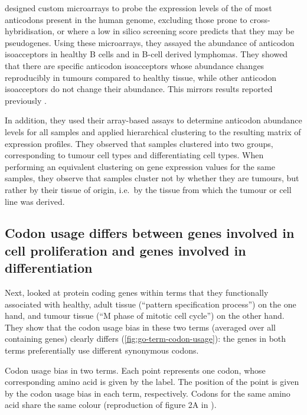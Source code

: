 \citet{Gingold:2014} designed custom microarrays to probe the expression levels
of the \trna[s] of most anticodons present in the human genome, excluding those
prone to cross-hybridi\-sation, or where a low in silico screening score
predicts that they may be pseudogenes. Using these microarrays, they assayed the
abundance of anticodon isoacceptors in healthy B cells and in B-cell derived
lymphomas. They showed that there are specific anticodon isoacceptors whose
abundance changes reproducibly in tumours compared to healthy tissue, while
other anticodon isoacceptors do not change their abundance. This mirrors results
reported previously \citep{Pavon-Eternod:2009}.

In addition, they used their array-based assays to determine \trna anticodon
abundance levels for all samples and applied hierarchical clustering to the
resulting matrix of \trna expression profiles. They observed that samples
clustered into two groups, corresponding to tumour cell types and
differentiating cell types. When performing an equivalent clustering on \mrna
gene expression values for the same samples, they observe that samples cluster
not by whether they are tumours, but rather by their tissue of origin, i.e.\ by
the tissue from which the tumour or cell line was derived.

\subsection{Codon usage differs between genes involved in cell proliferation and
genes involved in differentiation}

Next, \citet{Gingold:2014} looked at protein coding genes within \go terms that
they functionally associated with healthy, adult tissue (“pattern specification
process”) on the one hand, and tumour tissue (“M phase of mitotic cell cycle”)
on the other hand. They show that the codon usage bias in these two \go terms
(averaged over all containing genes) clearly differs
(\cref{fig:go-term-codon-usage}): the genes in both \go terms preferentially use
different synonymous codons.

    {Codon usage bias in two  terms.}
    {Each point represents one codon, whose corresponding amino acid is given by
    the label. The position of the point is given by the codon usage bias in
    each \go term, respectively. Codons for the same amino acid share the same
    colour (reproduction of figure 2A in \citet{Gingold:2014}).}

